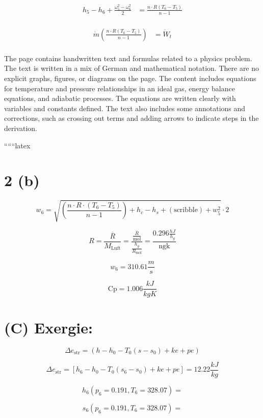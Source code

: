 \begin{align*}
h_5 - h_6 + \frac{\omega_5^2 - \omega_6^2}{2} &= \frac{n \cdot R (T_6 - T_5)}{n-1} \\
\end{align*}

\begin{align*}
\dot{m} \left( \frac{n \cdot R (T_6 - T_5)}{n-1} \right) &= \dot{W}_t \\
\end{align*}


The page contains handwritten text and formulas related to a physics problem. The text is written in a mix of German and mathematical notation. There are no explicit graphs, figures, or diagrams on the page. The content includes equations for temperature and pressure relationships in an ideal gas, energy balance equations, and adiabatic processes. The equations are written clearly with variables and constants defined. The text also includes some annotations and corrections, such as crossing out terms and adding arrows to indicate steps in the derivation.

``````latex


\section*{2 (b)}

\[
w_6 = \sqrt{\left( \frac{n \cdot R \cdot (T_6 - T_5)}{n - 1} \right) + h_c - h_s + \left( \text{scribble} \right) + w_5^2} \cdot 2
\]

\[
R = \frac{\overline{R}}{M_{\text{Luft}}} = \frac{\frac{\overline{R}}{\text{mol}}}{\frac{h_g}{R_{\text{mol}}}} = \frac{0.296 \frac{hJ}{h_g}}{\text{ngk}}
\]

\[
w_6 = 310.61 \frac{m}{s}
\]

\[
\text{Cp} = 1.006 \frac{kJ}{kgK}
\]

\section*{(C) Exergie:}

\[
\Delta e_{\text{str}} = (h - h_0 - T_0 (s - s_0) + ke + pe)
\]

\[
\Delta e_{\text{str}} = \left[ h_6 - h_0 - T_0 (s_6 - s_0) + ke + pe \right] = 12.22 \frac{kJ}{kg}
\]

\[
h_6 (p_6 = 0.191, T_6 = 328.07) = 
\]

\[
s_6 (p_6 = 0.191, T_6 = 328.07) = 
\]

